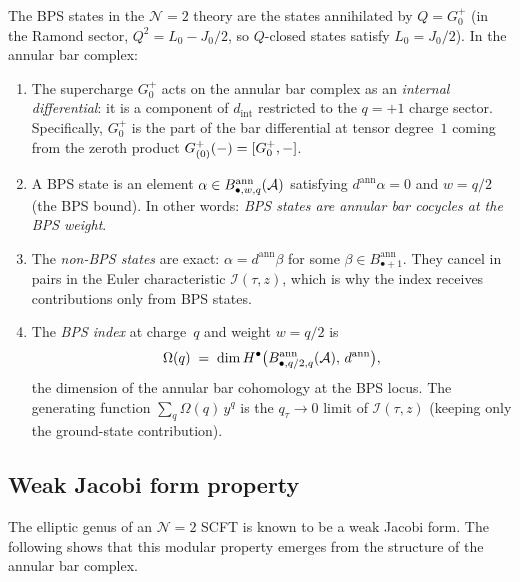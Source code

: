 \begin{remark}%
\label{rem:bps-bar-cocycles}%
%
%
The BPS states in the $\mathcal N=2$ theory are the
states annihilated by $Q = G^+_0$ (in the Ramond sector,
$Q^2 = L_0 - J_0/2$, so $Q$-closed states satisfy
$L_0 = J_0/2$). In the annular bar complex:

\begin{enumerate}[label=(\roman*)]
\item The supercharge $G^+_0$ acts on the annular bar
 complex as an \emph{internal differential}: it is a
 component of $d_{\mathrm{int}}$ restricted to the
 $q=+1$ charge sector. Specifically,
 $G^+_0$ is the part of the bar differential at tensor
 degree~$1$ coming from the zeroth product
 $G^+_{(0)}(-) = [G^+_0, -]$.

\item A BPS state is an element
 $\alpha\in B^{\mathrm{ann}}_{\bullet,w,q}(\mathcal{A})$
 satisfying $d^{\mathrm{ann}}\alpha = 0$ and
 $w = q/2$ (the BPS bound). In other words:
 \emph{BPS states are annular bar cocycles at the
 BPS weight}.

\item The \emph{non-BPS states} are exact:
 $\alpha = d^{\mathrm{ann}}\beta$ for some
 $\beta\in B^{\mathrm{ann}}_{\bullet+1}$. They
 cancel in pairs in the Euler characteristic
 $\mathcal{I}(\tau,z)$, which is why the index
 receives contributions only from BPS states.

\item The \emph{BPS index} at charge~$q$ and weight
 $w = q/2$ is
 \[
 \Omega(q)
 \;=\;
 \dim H^\bullet\bigl(
 B^{\mathrm{ann}}_{\bullet,q/2,q}(\mathcal{A}),\,
 d^{\mathrm{ann}}
 \bigr),
 \]
 the dimension of the annular bar cohomology at the
 BPS locus. The generating function
 $\sum_q \Omega(q)\,y^q$ is the $q_\tau\to 0$ limit
 of $\mathcal{I}(\tau,z)$ (keeping only the ground-state
 contribution).
\end{enumerate}
\end{remark}

\subsection{Weak Jacobi form property}
\label{subsec:weak-jacobi}

The elliptic genus of an $\mathcal N=2$ SCFT is known
to be a weak Jacobi form. The following shows that this modular
property emerges from the structure of the annular bar
complex.

